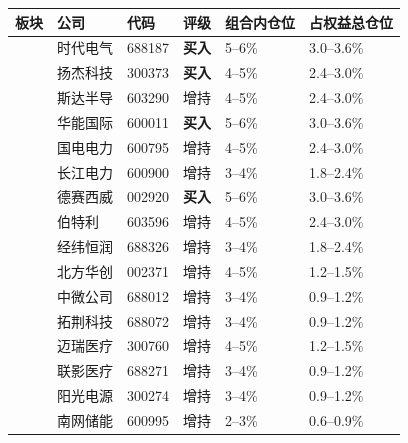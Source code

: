 \begin{exhibitbox}[表8-4B：核心+卫星组合标的最终仓位映射总览]
\centering
\small
\setlength{\tabcolsep}{3pt}
\setlength{\aboverulesep}{0pt}
\setlength{\belowrulesep}{0pt}
\begin{tabularx}{\linewidth}{L{2.8cm} L{1.8cm} C{1.5cm} C{1.3cm} C{1.8cm} X}
\toprule
\textbf{板块} & \textbf{公司} & \textbf{代码} & \textbf{评级} & \textbf{组合内仓位} & \textbf{占权益总仓位} \\
\midrule
{}
& 时代电气 & 688187 & \textbf{买入} & 5--6\% & 3.0--3.6\% \\
& 扬杰科技 & 300373 & \textbf{买入} & 4--5\% & 2.4--3.0\% \\
 & 斯达半导 & 603290 & 增持 & 4--5\% & 2.4--3.0\% \\
& 华能国际 & 600011 & \textbf{买入} & 5--6\% & 3.0--3.6\% \\
& 国电电力 & 600795 & 增持 & 4--5\% & 2.4--3.0\% \\
 & 长江电力 & 600900 & 增持 & 3--4\% & 1.8--2.4\% \\
& 德赛西威 & 002920 & \textbf{买入} & 5--6\% & 3.0--3.6\% \\
& 伯特利 & 603596 & 增持 & 4--5\% & 2.4--3.0\% \\
 & 经纬恒润 & 688326 & 增持 & 3--4\% & 1.8--2.4\% \\
\midrule
{}
& 北方华创 & 002371 & 增持 & 4--5\% & 1.2--1.5\% \\
& 中微公司 & 688012 & 增持 & 3--4\% & 0.9--1.2\% \\
 & 拓荆科技 & 688072 & 增持 & 3--4\% & 0.9--1.2\% \\
& 迈瑞医疗 & 300760 & 增持 & 4--5\% & 1.2--1.5\% \\
 & 联影医疗 & 688271 & 增持 & 3--4\% & 0.9--1.2\% \\
& 阳光电源 & 300274 & 增持 & 3--4\% & 0.9--1.2\% \\
 & 南网储能 & 600995 & 增持 & 2--3\% & 0.6--0.9\% \\
\bottomrule
\end{tabularx}
\vspace{0.3em}
\end{exhibitbox}


